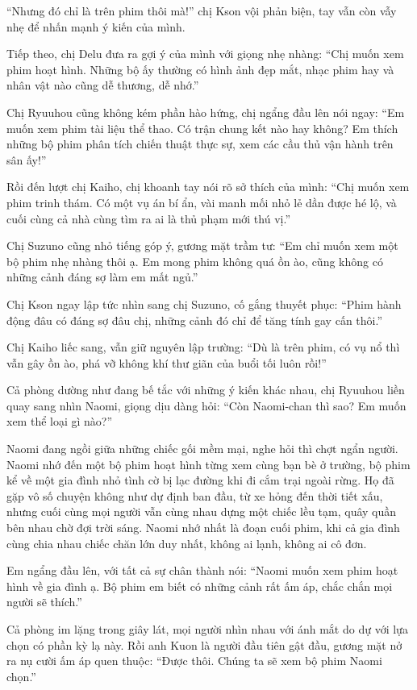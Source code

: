 \documentclass[../main.tex]{subfiles}
\begin{document}
``Nhưng đó chỉ là trên phim thôi mà!'' chị Kson vội phản biện, tay vẫn còn vẫy nhẹ để nhấn mạnh ý kiến của mình.

Tiếp theo, chị Delu đưa ra gợi ý của mình với giọng nhẹ nhàng: ``Chị muốn xem phim hoạt hình. Những bộ ấy thường có hình ảnh đẹp mắt, nhạc phim hay và nhân vật nào cũng dễ thương, dễ nhớ.''

Chị Ryuuhou cũng không kém phần hào hứng, chị ngẩng đầu lên nói ngay: ``Em muốn xem phim tài liệu thể thao. Có trận chung kết nào hay không? Em thích những bộ phim phân tích chiến thuật thực sự, xem các cầu thủ vận hành trên sân ấy!''

Rồi đến lượt chị Kaiho, chị khoanh tay nói rõ sở thích của mình: ``Chị muốn xem phim trinh thám. Có một vụ án bí ẩn, vài manh mối nhỏ lẻ dần được hé lộ, và cuối cùng cả nhà cùng tìm ra ai là thủ phạm mới thú vị.''

Chị Suzuno cũng nhỏ tiếng góp ý, gương mặt trầm tư: ``Em chỉ muốn xem một bộ phim nhẹ nhàng thôi ạ. Em mong phim không quá ồn ào, cũng không có những cảnh đáng sợ làm em mất ngủ.''

Chị Kson ngay lập tức nhìn sang chị Suzuno, cố gắng thuyết phục: ``Phim hành động đâu có đáng sợ đâu chị, những cảnh đó chỉ để tăng tính gay cấn thôi.''

Chị Kaiho liếc sang, vẫn giữ nguyên lập trường: ``Dù là trên phim, có vụ nổ thì vẫn gây ồn ào, phá vỡ không khí thư giãn của buổi tối luôn rồi!''

Cả phòng dường như đang bế tắc với những ý kiến khác nhau, chị Ryuuhou liền quay sang nhìn Naomi, giọng dịu dàng hỏi: ``Còn Naomi-chan thì sao? Em muốn xem thể loại gì nào?''

Naomi đang ngồi giữa những chiếc gối mềm mại, nghe hỏi thì chợt ngẩn người. Naomi nhớ đến một bộ phim hoạt hình từng xem cùng bạn bè ở trường, bộ phim kể về một gia đình nhỏ tình cờ bị lạc đường khi đi cắm trại ngoài rừng. Họ đã gặp vô số chuyện không như dự định ban đầu, từ xe hỏng đến thời tiết xấu, nhưng cuối cùng mọi người vẫn cùng nhau dựng một chiếc lều tạm, quây quần bên nhau chờ đợi trời sáng. Naomi nhớ nhất là đoạn cuối phim, khi cả gia đình cùng chia nhau chiếc chăn lớn duy nhất, không ai lạnh, không ai cô đơn.

Em ngẩng đầu lên, với tất cả sự chân thành nói: ``Naomi muốn xem phim hoạt hình về gia đình ạ. Bộ phim em biết có những cảnh rất ấm áp, chắc chắn mọi người sẽ thích.''

Cả phòng im lặng trong giây lát, mọi người nhìn nhau với ánh mắt do dự với lựa chọn có phần kỳ lạ này. Rồi anh Kuon là người đầu tiên gật đầu, gương mặt nở ra nụ cười ấm áp quen thuộc: ``Được thôi. Chúng ta sẽ xem bộ phim Naomi chọn.''
\end{document}
